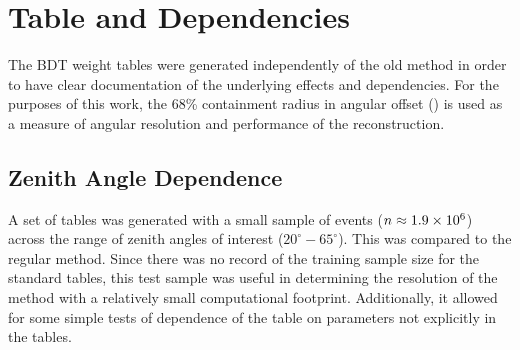 \documentclass[main.tex]{subfiles}
\begin{document}




\section{\disp Table and \rse Dependencies}
The BDT weight tables were generated independently of the old \disp method in order to have clear documentation of the underlying effects and dependencies. For the purposes of this work, the 68\% containment radius in angular offset (\rse\hspace{-4pt}) is used as a measure of angular resolution and performance of the reconstruction.

\subsection{Zenith Angle Dependence}
A set of \disp tables was generated with a small sample of events ($n\approx 1.9\times 10^{6}$) across the range of zenith angles of interest ($20^\circ-65^\circ$). This was compared to the regular \disp method. Since there was no record of the training sample size for the standard tables, this test sample was useful in determining the resolution of the \disp method with a relatively small computational footprint. Additionally, it allowed for some simple tests of dependence of the \disp table on parameters not explicitly in the \disp tables.
\end{document}
